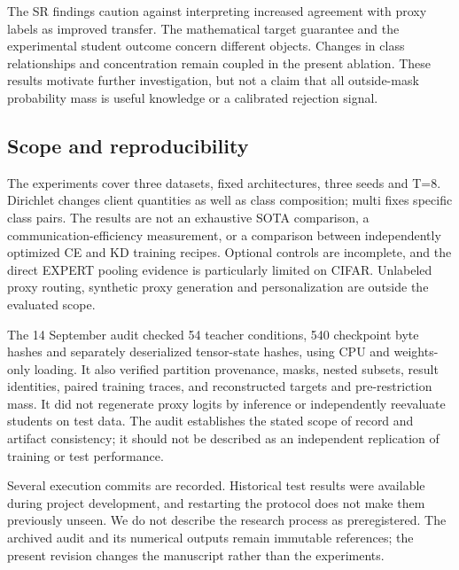 The SR findings caution against interpreting increased agreement with proxy labels as improved transfer. The mathematical target guarantee and the experimental student outcome concern different objects. Changes in class relationships and concentration remain coupled in the present ablation. These results motivate further investigation, but not a claim that all outside-mask probability mass is useful knowledge or a calibrated rejection signal.

\hypertarget{scope-and-reproducibility}{%
\subsection{Scope and reproducibility}\label{scope-and-reproducibility}}

The experiments cover three datasets, fixed architectures, three seeds and T=8. Dirichlet changes client quantities as well as class composition; multi fixes specific class pairs. The results are not an exhaustive SOTA comparison, a communication-efficiency measurement, or a comparison between independently optimized CE and KD training recipes. Optional controls are incomplete, and the direct EXPERT pooling evidence is particularly limited on CIFAR. Unlabeled proxy routing, synthetic proxy generation and personalization are outside the evaluated scope.

The 14 September audit checked 54 teacher conditions, 540 checkpoint byte hashes and separately deserialized tensor-state hashes, using CPU and weights-only loading. It also verified partition provenance, masks, nested subsets, result identities, paired training traces, and reconstructed targets and pre-restriction mass. It did not regenerate proxy logits by inference or independently reevaluate students on test data. The audit establishes the stated scope of record and artifact consistency; it should not be described as an independent replication of training or test performance.

Several execution commits are recorded. Historical test results were available during project development, and restarting the protocol does not make them previously unseen. We do not describe the research process as preregistered. The archived audit and its numerical outputs remain immutable references; the present revision changes the manuscript rather than the experiments.
